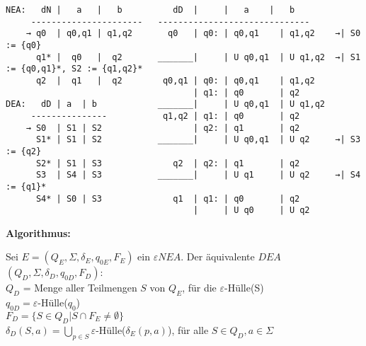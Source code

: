 \documentclass[11pt,
			a4paper,
			parskip=full,
			toc=bib,
			toc=idx,
			toc=listof,
			ngerman
			listof=totoc,]{scrartcl}
\newcommand{\concept}[1]{%
	\sf{%
		\textbf{%
				\textcolor{mymauve}{#1}%
		}%
	}%
	\rm%
}
\newenvironment{algo}[1]%
{	\begin{framed}
	\textbf{Algorithmus:} \concept{#1}}%
{\end{framed}}
\newenvironment{expl}%
{\color{red}}
{\color{black}}
\newcommand{\compress}{\vspace{-1em}}
\begin{document}
\compress
\begin{expl}
\begin{verbatim}
NEA:   dN |   a   |   b          dD  |     |   a    |   b       
     ----------------------   ------------------------------                        
    → q0  | q0,q1 | q1,q2       q0   | q0: | q0,q1    | q1,q2    →| S0 := {q0}                  
      q1* |  q0   |  q2       _______|     | U q0,q1  | U q1,q2  →| S1 := {q0,q1}*, S2 := {q1,q2}*             
      q2  |  q1   |  q2        q0,q1 | q0: | q0,q1    | q1,q2         
                                     | q1: | q0       | q2                         
DEA:   dD | a  | b            _______|     | U q0,q1  | U q1,q2                                                       
     ---------------           q1,q2 | q1: | q0       | q2                         
    → S0  | S1 | S2                  | q2: | q1       | q2                         
      S1* | S1 | S2           _______|     | U q0,q1  | U q2     →| S3 := {q2}                
      S2* | S1 | S3              q2  | q2: | q1       | q2            
      S3  | S4 | S3           _______|     | U q1     | U q2     →| S4 := {q1}*
      S4* | S0 | S3              q1  | q1: | q0       | q2                          
                                     |     | U q0     | U q2                            
\end{verbatim}
\end{expl}



\compress
\begin{algo}{$ε$NEA → DEA}

\compress
Sei $E = (Q_E,Σ,δ_E,q_{0E},F_E)$ ein $εNEA$. Der äquivalente $DEA$ $(Q_D,Σ,δ_D,q_{0D},F_D)$:\\
$Q_D$ = Menge aller Teilmengen $S$ von $Q_E$, für die $ε$-Hülle(S)\\
$q_{0D} = ε$-Hülle($q_0$)\\
$F_D = \{S \in Q_D | S ∩ F_E ≠ ∅ \}$\\
$δ_D(S,a) = \bigcup\limits_{p \in S} ε$-Hülle($δ_E(p,a)$), für alle $S \in Q_D, a \in Σ $\\
\end{algo}
\compress
\end{document}
